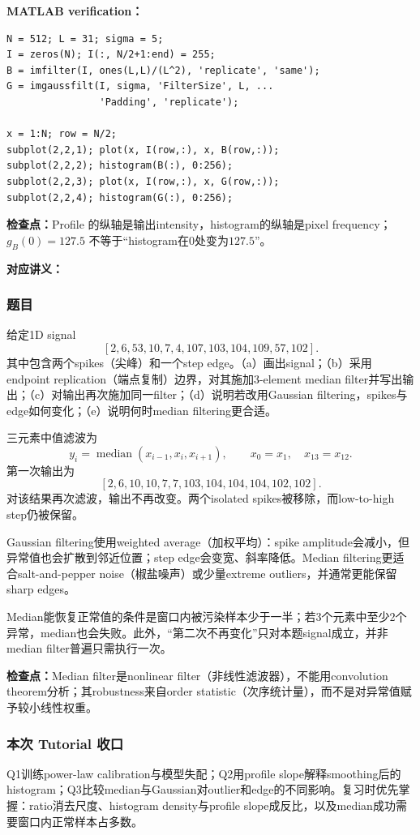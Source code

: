 \begin{checkedsolution}
\textbf{MATLAB verification：}
\begin{verbatim}
N = 512; L = 31; sigma = 5;
I = zeros(N); I(:, N/2+1:end) = 255;
B = imfilter(I, ones(L,L)/(L^2), 'replicate', 'same');
G = imgaussfilt(I, sigma, 'FilterSize', L, ...
                'Padding', 'replicate');

x = 1:N; row = N/2;
subplot(2,2,1); plot(x, I(row,:), x, B(row,:));
subplot(2,2,2); histogram(B(:), 0:256);
subplot(2,2,3); plot(x, I(row,:), x, G(row,:));
subplot(2,2,4); histogram(G(:), 0:256);
\end{verbatim}
\end{checkedsolution}

\textbf{检查点：}Profile 的纵轴是输出intensity，histogram的纵轴是pixel frequency；$g_B(0)=127.5$ 不等于“histogram在$0$处变为$127.5$”。


\textbf{对应讲义：}

\subsubsection*{题目}

给定1D signal
\[
  [2,6,53,10,7,4,107,103,104,109,57,102].
\]
其中包含两个spikes（尖峰）和一个step edge。（a）画出signal；（b）采用endpoint replication（端点复制）边界，对其施加3-element median filter并写出输出；（c）对输出再次施加同一filter；（d）说明若改用Gaussian filtering，spikes与edge如何变化；（e）说明何时median filtering更合适。

\begin{checkedsolution}
三元素中值滤波为
\[
  y_i=\operatorname{median}(x_{i-1},x_i,x_{i+1}),
  \qquad x_0=x_1,\quad x_{13}=x_{12}.
\]
第一次输出为
\[
  \boxed{[2,6,10,10,7,7,103,104,104,104,102,102]}.
\]
对该结果再次滤波，输出不再改变。两个isolated spikes被移除，而low-to-high step仍被保留。

Gaussian filtering使用weighted average（加权平均）：spike amplitude会减小，但异常值也会扩散到邻近位置；step edge会变宽、斜率降低。Median filtering更适合salt-and-pepper noise（椒盐噪声）或少量extreme outliers，并通常更能保留sharp edges。

Median能恢复正常值的条件是窗口内被污染样本少于一半；若3个元素中至少2个异常，median也会失败。此外，“第二次不再变化”只对本题signal成立，并非median filter普遍只需执行一次。
\end{checkedsolution}

\textbf{检查点：}Median filter是nonlinear filter（非线性滤波器），不能用convolution theorem分析；其robustness来自order statistic（次序统计量），而不是对异常值赋予较小线性权重。

\subsubsection*{本次 Tutorial 收口}

Q1训练power-law calibration与模型失配；Q2用profile slope解释smoothing后的histogram；Q3比较median与Gaussian对outlier和edge的不同影响。复习时优先掌握：ratio消去尺度、histogram density与profile slope成反比，以及median成功需要窗口内正常样本占多数。

